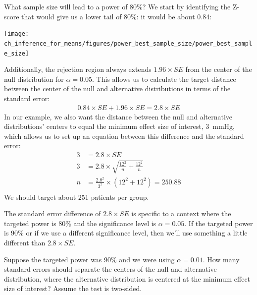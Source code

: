 \begin{examplewrap}
\begin{nexample}{What sample size will lead to a power of 80\%?}
We start by identifying the Z-score that would give us a lower tail of 80\%: it would be about 0.84:
\begin{center}
\texttt{[image: ch\_inference\_for\_means/figures/power\_best\_sample\_size/power\_best\_sample\_size]}
\end{center}
Additionally, the rejection region always extends $1.96\times SE$ from the center of the null distribution for $\alpha = 0.05$. This allows us to calculate the target distance between the center of the null and alternative distributions in terms of the standard error:
\begin{align*}
0.84 \times SE + 1.96 \times SE = 2.8 \times SE
\end{align*}
In our example, we also want the distance between the null and alternative distributions' centers to equal the minimum effect size of interest, 3~mmHg, which allows us to set up an equation between this difference and the standard error:
\begin{align*}
3 &= 2.8 \times SE \\
3 &= 2.8 \times \sqrt{\frac{12^2}{n} + \frac{12^2}{n}} \\
n &= \frac{2.8^2}{3^2} \times \left( 12^2 + 12^2 \right) = 250.88 \\
\end{align*}
We should target about 251 patients per group.
\end{nexample}
\end{examplewrap}

The standard error difference of $2.8 \times SE$ is specific to a context where the targeted power is 80\% and the significance level is $\alpha = 0.05$. If the targeted power is 90\% or if we use a different significance level, then we'll use something a little different than $2.8 \times SE$.

\begin{exercisewrap}
\begin{nexercise}
Suppose the targeted power was 90\% and we were using $\alpha = 0.01$. How many standard errors should separate the centers of the null and alternative distribution, where the alternative distribution is centered at the minimum effect size of interest? Assume the test is two-sided.\footnotemark{}
\end{nexercise}
\end{exercisewrap}

